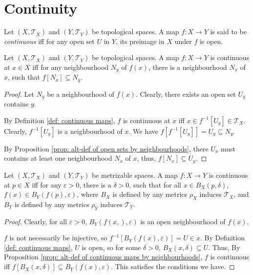 \section{Continuity}

\begin{definition}
	\label{def: continuous maps}
	Let $(X, \mathcal T_X)$ and $(Y, \mathcal T_Y)$ be topological spaces. A map $f: X \to Y$ is said to be \textit{continuous} iff for any open set $U$ in $Y$, its preimage in $X$ under $f$ is open.
\end{definition}


\begin{proposition}
	\label{prop: alt-def of continuous maps by neighbourhoods}
	Let $(X, \mathcal T_X)$ and $(Y, \mathcal T_Y)$ be topological spaces. A map $f: X \to Y$ is continuous at $x \in X$ iff for any neighbourhood $N_y$ of $f(x)$, there is a neighbourhood $N_x$ of $x$, such that $f[N_x] \subseteq N_y$.
	
	\begin{proof}
		Let $N_y$ be a neighbourhood of $f(x)$. Clearly, there exists an open set $U_y$ contains $y$.
	
		By Definition \ref{def: continuous maps}, $f$ is continuous at $x$ iff $x \in f^{-1}[U_y] \in \mathcal T_X$. Clearly, $f^{-1}[U_y]$ is a neighbourhood of $x$. We have $f[f^{-1}[U_y]] = U_y \subseteq N_y$.
		
		By Proposition \ref{prop: alt-def of open sets by neighbourhoods}, there $U_x$ must contains at least one neighbourhood $N_x$ of $x$, thus, $f[N_x] \subseteq U_y$.
	\end{proof}
\end{proposition}


\begin{proposition}
	Let $(X, \mathcal T_X)$ and $(Y, \mathcal T_{Y})$ be metrizable spaces. A map $f: X \to Y$ is continuous at $p \in X$ iff for any $\varepsilon > 0$, there is a $\delta > 0$, such that for all $x \in B_X(p, \delta)$, $f(x) \in B_Y(f(p), \varepsilon)$, where $B_X$ is defined by any metrics $\rho_X$ induces $\mathcal T_X$, and $B_Y$ is defined by any metrics $\rho_Y$ induces $\mathcal T_Y$.
	
	\begin{proof}
		Clearly, for all $\varepsilon > 0$, $B_Y(f(x,), \varepsilon)$ is an open neighbourhood of $f(x)$.
		
		$f$ is not necessarily be injective, so $f^{-1}[B_Y(f(x), \varepsilon)] = U \in x$. By Definition \ref{def: continuous maps}, $U$ is open, so for some $\delta > 0$, $B_X(x, \delta) \subseteq U$. Thus, By Proposition \ref{prop: alt-def of continuous maps by neighbourhoods}, $f$ is continuous iff $f[B_X(x, \delta)] \subseteq B_Y(f(x), \varepsilon)$. This satisfies the conditions we have.
	\end{proof}
\end{proposition}


